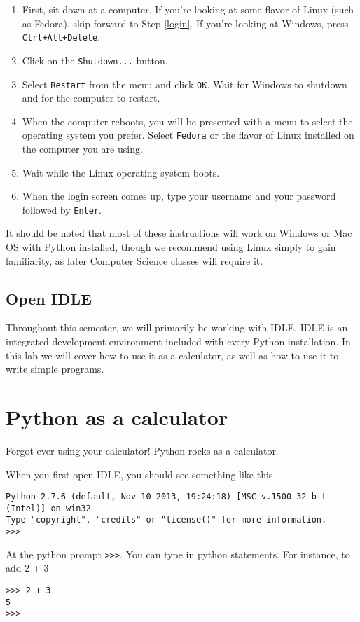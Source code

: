 \documentclass[12pt]{article}
\begin{document}
\begin{enumerate}
\item First, sit down at a computer. If you're looking at some flavor of Linux (such as Fedora), skip forward to Step \ref{login}. If you're looking at Windows, press \texttt{Ctrl+Alt+Delete}.
\item Click on the \texttt{Shutdown...} button.
\item Select \texttt{Restart} from the menu and click \texttt{OK}. Wait for Windows to shutdown and for the computer to restart.
\item When the computer reboots, you will be presented with a menu to select the operating system you prefer. Select \texttt{Fedora} or the flavor of Linux installed on the computer you are using.
\item Wait while the Linux operating system boots.
\item \label{login} When the login screen comes up, type your username and your password followed by \texttt{Enter}.
\end{enumerate}

It should be noted that most of these instructions will work on Windows or Mac OS with Python installed, though we recommend using Linux simply to gain familiarity, as later Computer Science classes will require it.

\subsection{Open IDLE}
Throughout this semester, we will primarily be working with IDLE. IDLE is an integrated development environment included with every Python installation. In this lab we will cover how to use it as a calculator, as well as how to use it to write simple programs.

\section{Python as a calculator}
Forgot ever using your calculator! Python rocks as a calculator.

When you first open IDLE, you should see something like this
\begin{lstlisting}[style=bash]
Python 2.7.6 (default, Nov 10 2013, 19:24:18) [MSC v.1500 32 bit (Intel)] on win32
Type "copyright", "credits" or "license()" for more information.
>>> 
\end{lstlisting}

At the python prompt \texttt{>>>}. You can type in python statements. For instance, to add 2 + 3 
\begin{lstlisting}[style=bash]
>>> 2 + 3
5
>>>
\end{lstlisting}
\end{document}
